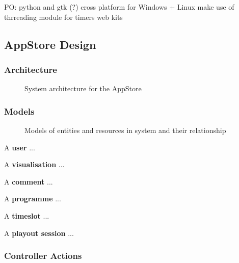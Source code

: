 \documentclass[a4paper, titlepage]{article}
\begin{document}
PO: 
  python and gtk (?)
  cross platform for Windows + Linux
  make use of thrreading module for timers
  web kits


\subsection{AppStore Design}


\subsubsection{Architecture}

\begin{figure}[ht]
  \centering
  \caption{System architecture for the AppStore}
  \label{fig:impl_models}
\end{figure}


\subsubsection{Models}

\begin{figure}[ht]
  \centering
  \caption{Models of entities and resources in system and their relationship}
  \label{fig:impl_models}
\end{figure}


A \textbf{user} ...

A \textbf{visualisation} ...

A \textbf{comment} ...

A \textbf{programme} ...

A \textbf{timeslot} ...

A \textbf{playout session} ...


\subsubsection{Controller Actions}

\end{document}
